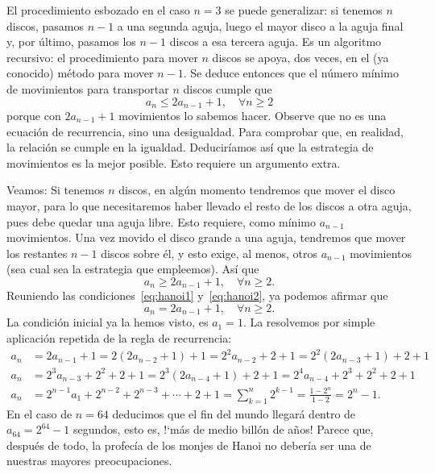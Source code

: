El procedimiento esbozado en el caso $n=3$ se puede generalizar: si tenemos $n$ discos, pasamos $n-1$ a una segunda aguja, luego el mayor disco a la aguja final y, por último, pasamos los $n-1$ discos a esa tercera aguja. Es un algoritmo recursivo: el procedimiento para mover $n$ discos se apoya, dos veces, en el (ya conocido) método para mover $n-1$. Se deduce entonces que el número mínimo de movimientos para transportar $n$ discos cumple que
\begin{equation}\label{eq:hanoi1}
	a_{n}\leq 2a_{n-1}+1,\quad\forall n\geq2
\end{equation} porque con $2a_{n-1}+1$ movimientos lo sabemos hacer. Observe que no es una ecuación de recurrencia, sino una desigualdad. Para comprobar que, en realidad, la
relación se cumple en la igualdad. Deduciríamos así que la estrategia de movimientos es la mejor posible. Esto requiere un argumento extra.

Veamos: Si tenemos $n$ discos, en algún momento tendremos que mover el disco mayor, para lo que necesitaremos haber llevado el resto de los discos a otra aguja, pues debe quedar una aguja libre. Esto requiere, como mínimo $a_{n-1}$ movimientos. Una vez movido el disco grande a una aguja, tendremos que mover los restantes $n-1$ discos sobre él, y esto exige, al menos, otros $a_{n-1}$ movimientos (sea cual sea la estrategia que empleemos). Así que
\begin{equation}\label{eq:hanoi2}
	a_{n}\geq 2a_{n-1}+1,\quad\forall n \geq 2.
\end{equation}
Reuniendo las condiciones~\eqref{eq:hanoi1} y~\eqref{eq:hanoi2}, ya podemos afirmar que
\begin{equation}
	a_{n}= 2a_{n-1}+1,\quad\forall n\geq2.
\end{equation}
La condición inicial ya la hemos visto, es $a_{1}=1$. La resolvemos por simple aplicación repetida de la regla de recurrencia:
\begin{align*}
	a_{n}&=2a_{n-1}+1=2\left(2a_{n-2}+1\right)+1=2^{2}a_{n-2}+2+1=2^{2}\left(2a_{n-3}+1\right)+2+1\\
	a_{n}&= 2^{3}a_{n-3}+2^{2}+2+1=2^{3}(2a_{n-4}+1)+2+1=2^{4}a_{n-4}+2^{3}+2^{2}+2+1\\
	a_{n}&=2^{n-1}a_{1}+2^{n-2}+2^{n-3}+\cdots+2+1=\sum_{k=1}^{n}2^{k-1}=\frac{1-2^{n}}{1-2}=2^{n}-1.
\end{align*}
En el caso de $n=64$ deducimos que el fin del mundo llegará dentro de $a_{64}= 2^{64}-1$ segundos, esto es, !`más de medio billón de años! Parece que, después de todo, la profecía de los monjes de Hanoi no debería ser una de nuestras mayores preocupaciones.

